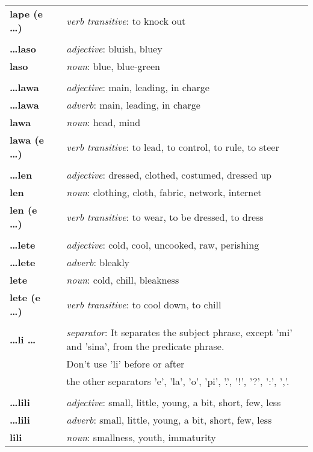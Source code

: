 \begin{supertabular}{p{2,5cm}|ll}
\textbf{lape (e \dots)} && \textit{verb transitive}: to knock out \\ 
 && \\ %
\textbf{\dots laso} && \textit{adjective}: bluish, bluey \\ 
\textbf{laso} && \textit{noun}: blue, blue-green \\ 
 && \\ %
\textbf{\dots lawa} && \textit{adjective}: main, leading, in charge \\ 
\textbf{\dots lawa} && \textit{adverb}: main, leading, in charge \\ 
\textbf{lawa} && \textit{noun}: head, mind \\ 
\textbf{lawa (e \dots)} && \textit{verb transitive}: to lead, to control, to rule, to steer \\ 
 && \\ %
\textbf{\dots len} && \textit{adjective}: dressed, clothed, costumed, dressed up \\ 
\textbf{len} && \textit{noun}: clothing, cloth, fabric, network, internet \\ 
\textbf{len (e \dots)} && \textit{verb transitive}: to wear, to be dressed, to dress \\ 
 && \\ %
\textbf{\dots lete} && \textit{adjective}: cold, cool, uncooked, raw, perishing \\ 
\textbf{\dots lete} && \textit{adverb}: bleakly \\ 
\textbf{lete} && \textit{noun}: cold, chill, bleakness \\ 
\textbf{lete (e \dots)} && \textit{verb transitive}: to cool down, to chill \\ 
 && \\ %
\textbf{\dots li \dots} && \textit{separator}: It separates the subject phrase, except 'mi' and 'sina', from the predicate phrase. \\ && Don't use 'li' before or after \\ && the other separators 'e', 'la', 'o', 'pi', '.', '!', '?', ':', ','. \\ 
 && \\ %
\textbf{\dots lili} && \textit{adjective}: small, little, young, a bit, short, few, less \\ 
\textbf{\dots lili} && \textit{adverb}: small, little, young, a bit, short, few, less \\ 
\textbf{lili} && \textit{noun}: smallness, youth, immaturity \\ 

\end{supertabular}
